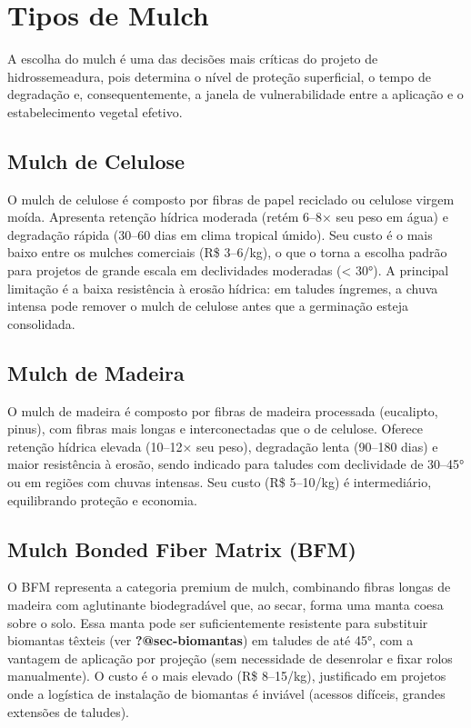 \documentclass[
  portuguese,
  11pt,
  a4paper,
  open=any]{scrbook}
\begin{document}
\section{Tipos de Mulch}\label{tipos-de-mulch}

A escolha do mulch é uma das decisões mais críticas do projeto de
hidrossemeadura, pois determina o nível de proteção superficial, o tempo
de degradação e, consequentemente, a janela de vulnerabilidade entre a
aplicação e o estabelecimento vegetal efetivo.

\subsection{Mulch de Celulose}\label{mulch-de-celulose}

O mulch de celulose é composto por fibras de papel reciclado ou celulose
virgem moída. Apresenta retenção hídrica moderada (retém 6--8× seu peso
em água) e degradação rápida (30--60 dias em clima tropical úmido). Seu
custo é o mais baixo entre os mulches comerciais (R\$ 3--6/kg), o que o
torna a escolha padrão para projetos de grande escala em declividades
moderadas (\textless{} 30°). A principal limitação é a baixa resistência
à erosão hídrica: em taludes íngremes, a chuva intensa pode remover o
mulch de celulose antes que a germinação esteja consolidada.

\subsection{Mulch de Madeira}\label{mulch-de-madeira}

O mulch de madeira é composto por fibras de madeira processada
(eucalipto, pinus), com fibras mais longas e interconectadas que o de
celulose. Oferece retenção hídrica elevada (10--12× seu peso),
degradação lenta (90--180 dias) e maior resistência à erosão, sendo
indicado para taludes com declividade de 30--45° ou em regiões com
chuvas intensas. Seu custo (R\$ 5--10/kg) é intermediário, equilibrando
proteção e economia.

\subsection{Mulch Bonded Fiber Matrix
(BFM)}\label{mulch-bonded-fiber-matrix-bfm}

O BFM representa a categoria premium de mulch, combinando fibras longas
de madeira com aglutinante biodegradável que, ao secar, forma uma manta
coesa sobre o solo. Essa manta pode ser suficientemente resistente para
substituir biomantas têxteis (ver \textbf{?@sec-biomantas}) em taludes
de até 45°, com a vantagem de aplicação por projeção (sem necessidade de
desenrolar e fixar rolos manualmente). O custo é o mais elevado (R\$
8--15/kg), justificado em projetos onde a logística de instalação de
biomantas é inviável (acessos difíceis, grandes extensões de taludes).
\end{document}

